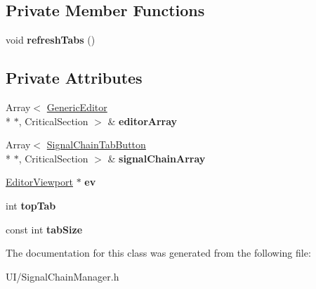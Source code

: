 \subsection*{Private Member Functions}
\begin{DoxyCompactItemize}
\item 
\hypertarget{classSignalChainManager_aae0be248f1f164de97d0321b95ca178a}{void {\bfseries refresh\-Tabs} ()}\label{classSignalChainManager_aae0be248f1f164de97d0321b95ca178a}

\end{DoxyCompactItemize}
\subsection*{Private Attributes}
\begin{DoxyCompactItemize}
\item 
\hypertarget{classSignalChainManager_ae2f623b0fb1f993e3b4993b87e839cce}{Array$<$ \hyperlink{classGenericEditor}{Generic\-Editor} \\*
$\ast$, Critical\-Section $>$ \& {\bfseries editor\-Array}}\label{classSignalChainManager_ae2f623b0fb1f993e3b4993b87e839cce}

\item 
\hypertarget{classSignalChainManager_a4cc0d862c46f508d5356a9ca150f3f16}{Array$<$ \hyperlink{classSignalChainTabButton}{Signal\-Chain\-Tab\-Button} \\*
$\ast$, Critical\-Section $>$ \& {\bfseries signal\-Chain\-Array}}\label{classSignalChainManager_a4cc0d862c46f508d5356a9ca150f3f16}

\item 
\hypertarget{classSignalChainManager_a61a72c10d356875f03212d48d5113e60}{\hyperlink{classEditorViewport}{Editor\-Viewport} $\ast$ {\bfseries ev}}\label{classSignalChainManager_a61a72c10d356875f03212d48d5113e60}

\item 
\hypertarget{classSignalChainManager_af2c3387af7ed6cda42c554681ed77eca}{int {\bfseries top\-Tab}}\label{classSignalChainManager_af2c3387af7ed6cda42c554681ed77eca}

\item 
\hypertarget{classSignalChainManager_aaf954c0fdb7e8fdf9092cdd9c3d4f7a4}{const int {\bfseries tab\-Size}}\label{classSignalChainManager_aaf954c0fdb7e8fdf9092cdd9c3d4f7a4}

\end{DoxyCompactItemize}


The documentation for this class was generated from the following file\-:\begin{DoxyCompactItemize}
\item 
U\-I/Signal\-Chain\-Manager.\-h\end{DoxyCompactItemize}
